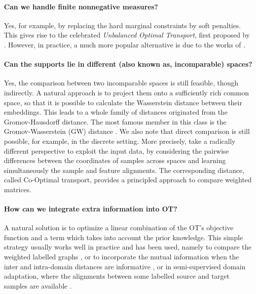 \paragraph{Can we handle finite nonnegative measures?} Yes, for example,
by replacing the hard marginal constraints by soft penalties.
This gives rise to the celebrated \textit{Unbalanced Optimal Transport}, first proposed by
\citet{Benamou03}. However, in practice, a much more popular alternative
is due to the works of \citet{Liero18,Frogner15}.

\paragraph{Can the supports lie in different (also known as, incomparable) spaces?}
Yes, the comparison between two incomparable spaces is still feasible, though indirectly.
A natural approach is to project them onto a sufficiently rich common space,
so that it is possible to calculate the Wasserstein distance between their embeddings.
This leads to a whole family of distances originated from the Gromov-Hausdorff distance.
The most famous member in this class is the Gromov-Wasserstein (GW) distance \citep{Memoli07,Memoli11}.
We also note that direct comparison is still possible, for example, in the discrete setting.
More precisely, \citet{Redko20} take a radically different perspective
to exploit the input data, by considering the pairwise differences between the coordinates
of samples across spaces and learning simultaneously the sample and feature alignments.
The corresponding distance, called Co-Optimal transport,
provides a principled approach to compare weighted matrices.

\paragraph{How can we integrate extra information into OT?} A natural solution is to optimize
a linear combination of the OT's objective function and a term which takes into account the
prior knowledge. This simple strategy usually works well in practice and has been used, namely to
compare the weighted labelled graphs \citep{Vayer19b}, or to incorporate the mutual information
when the inter and intra-domain distances are informative \citep{Chuang23},
or in semi-supervised domain adaptation, where the alignments between some labelled source
and target samples are available \citep{Courty16,Gu22}.


